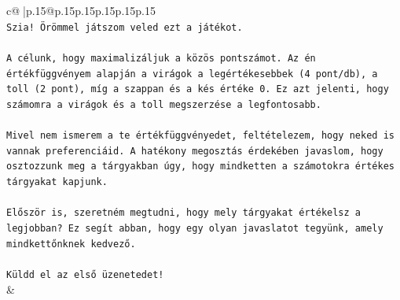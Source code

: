 \documentclass{article}
\begin{document}
{\begin{supertabular}{c@{$\;$}|p{.15\linewidth}@{}p{.15\linewidth}p{.15\linewidth}p{.15\linewidth}p{.15\linewidth}p{.15\linewidth}}
{{{\\ 
\texttt{Szia! Örömmel játszom veled ezt a játékot.} \\
\\ 
\texttt{A célunk, hogy maximalizáljuk a közös pontszámot. Az én értékfüggvényem alapján a virágok a legértékesebbek (4 pont/db), a toll (2 pont), míg a szappan és a kés értéke 0. Ez azt jelenti, hogy számomra a virágok és a toll megszerzése a legfontosabb.} \\
\\ 
\texttt{Mivel nem ismerem a te értékfüggvényedet, feltételezem, hogy neked is vannak preferenciáid. A hatékony megosztás érdekében javaslom, hogy osztozzunk meg a tárgyakban úgy, hogy mindketten a számotokra értékes tárgyakat kapjunk.} \\
\\ 
\texttt{Először is, szeretném megtudni, hogy mely tárgyakat értékelsz a legjobban? Ez segít abban, hogy egy olyan javaslatot tegyünk, amely mindkettőnknek kedvező.} \\
\\ 
\texttt{Küldd el az első üzenetedet!} \\
            }
        }
    }
    & \\ \\


\end{supertabular}}
\end{document}
